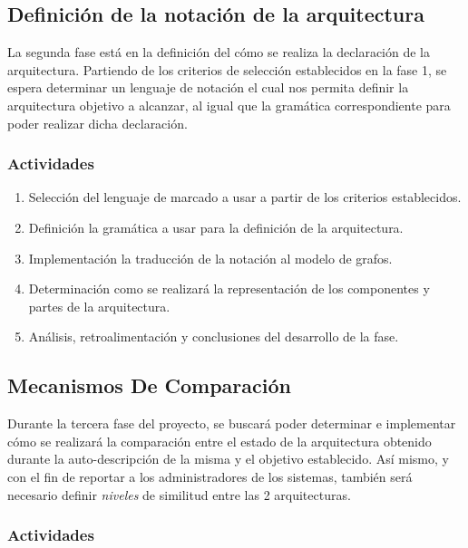 \documentclass[12pt]{article}
\begin{document}
    \subsection{Definición de la notación de la arquitectura}
    
    La segunda fase está en la definición del cómo se realiza la declaración de la arquitectura. Partiendo de los criterios de selección establecidos en la fase 1, se espera determinar un lenguaje de notación el cual nos permita definir la arquitectura objetivo a alcanzar, al igual que la gramática correspondiente para poder realizar dicha declaración. 
    
    \subsubsection*{Actividades}

    \begin{enumerate}[label=\thesubsection.\arabic*., wide, labelindent=2em, leftmargin=5em]
        \item Selección del lenguaje de marcado a usar a partir de los criterios establecidos.
        \item Definición la gramática a usar para la definición de la arquitectura.
        \item Implementación la traducción de la notación al modelo de grafos. %
        \item Determinación como se realizará la representación de los componentes y partes de la arquitectura.
        \item Análisis, retroalimentación y conclusiones del desarrollo de la fase. 
    \end{enumerate}    

    \subsection{Mecanismos De Comparación}

    Durante la tercera fase del proyecto, se buscará poder determinar e implementar cómo se realizará la comparación entre el estado de la arquitectura obtenido durante la auto-descripción de la misma y el objetivo establecido. Así mismo, y con el fin de reportar a los administradores de los sistemas, también será necesario definir \textit{niveles} de similitud entre las 2 arquitecturas.

    \subsubsection*{Actividades}
\end{document}
